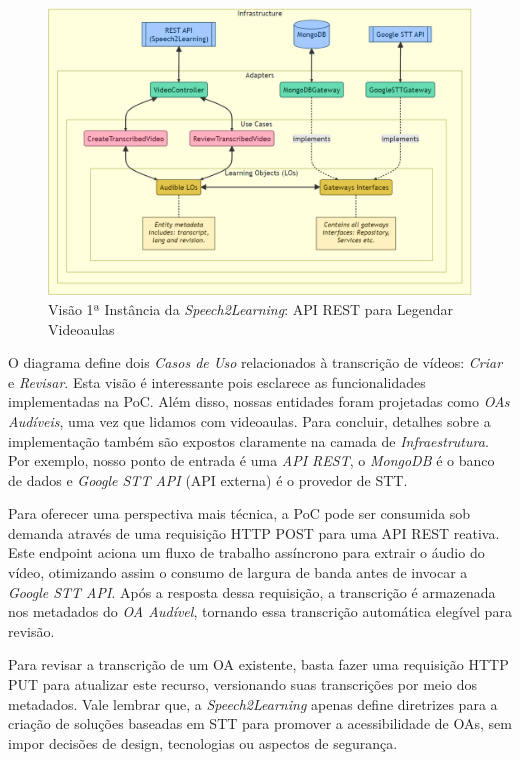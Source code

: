 \begin{figure}[htb]
\centering
\caption{Visão 1ª Instância da \textit{Speech2Learning}: API REST para Legendar Videoaulas}
\label{fig:chapter4-cs1-poc-diagram}
\includegraphics[width=\columnwidth]{images/chapter4-cs1-poc-diagram.png}
\end{figure}

O diagrama define dois \textit{Casos de Uso} relacionados à transcrição de vídeos: \textit{Criar} e \textit{Revisar}. Esta visão é interessante pois esclarece as funcionalidades implementadas na PoC. Além disso, nossas entidades foram projetadas como \textit{OAs Audíveis}, uma vez que lidamos com videoaulas. Para concluir, detalhes sobre a implementação também são expostos claramente na camada de \textit{Infraestrutura}. Por exemplo, nosso ponto de entrada é uma \textit{API REST}, o \textit{MongoDB} é o banco de dados e \textit{Google STT API} (API externa) é o provedor de STT.

Para oferecer uma perspectiva mais técnica, a PoC pode ser consumida sob demanda através de uma requisição HTTP POST para uma API REST reativa. Este endpoint aciona um fluxo de trabalho assíncrono para extrair o áudio do vídeo, otimizando assim o consumo de largura de banda antes de invocar a \textit{Google STT API}. Após a resposta dessa requisição, a transcrição é armazenada nos metadados do \textit{OA Audível}, tornando essa transcrição automática elegível para revisão.

Para revisar a transcrição de um OA existente, basta fazer uma requisição HTTP PUT para atualizar este recurso, versionando suas transcrições por meio dos metadados. Vale lembrar que, a \textit{Speech2Learning} apenas define diretrizes para a criação de soluções baseadas em STT para promover a acessibilidade de OAs, sem impor decisões de design, tecnologias ou aspectos de segurança.

